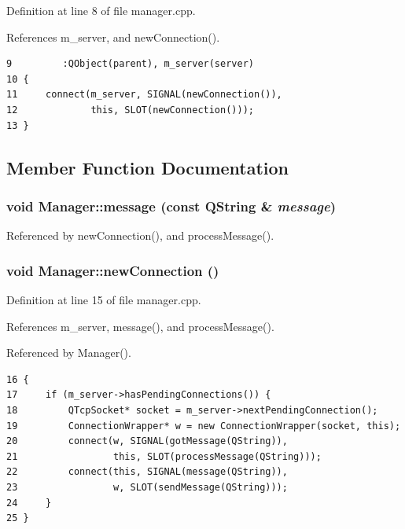 Definition at line 8 of file manager.cpp.

References m\_\-server, and newConnection().

\begin{Code}\begin{verbatim}9         :QObject(parent), m_server(server)
10 {
11     connect(m_server, SIGNAL(newConnection()),
12             this, SLOT(newConnection()));
13 }
\end{verbatim}
\end{Code}




\subsection{Member Function Documentation}
\subsubsection{\setlength{\rightskip}{0pt plus 5cm}void Manager::message (const QString \& {\em message})\hspace{0.3cm}{\tt  [signal]}}\label{classManager_5d591fad4739498d9b9dd0bdcaaebfc3}




Referenced by newConnection(), and processMessage().
\subsubsection{\setlength{\rightskip}{0pt plus 5cm}void Manager::newConnection ()\hspace{0.3cm}{\tt  [private, slot]}}\label{classManager_e7859713b4091f38ab52ad73c18fb2d2}




Definition at line 15 of file manager.cpp.

References m\_\-server, message(), and processMessage().

Referenced by Manager().

\begin{Code}\begin{verbatim}16 {
17     if (m_server->hasPendingConnections()) {
18         QTcpSocket* socket = m_server->nextPendingConnection();
19         ConnectionWrapper* w = new ConnectionWrapper(socket, this);
20         connect(w, SIGNAL(gotMessage(QString)),
21                 this, SLOT(processMessage(QString)));
22         connect(this, SIGNAL(message(QString)),
23                 w, SLOT(sendMessage(QString)));
24     }
25 }
\end{verbatim}
\end{Code}


